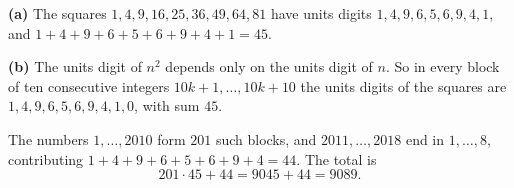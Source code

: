 \textbf{(a)} The squares $1,4,9,16,25,36,49,64,81$ have units digits $1,4,9,6,5,6,9,4,1$, and $1+4+9+6+5+6+9+4+1=45$.

\textbf{(b)} The units digit of $n^2$ depends only on the units digit of $n$. So in every block of ten consecutive integers $10k+1,\dots,10k+10$ the units digits of the squares are $1,4,9,6,5,6,9,4,1,0$, with sum $45$.

The numbers $1,\dots,2010$ form $201$ such blocks, and $2011,\dots,2018$ end in $1,\dots,8$, contributing $1+4+9+6+5+6+9+4=44$. The total is
\[
201\cdot45+44=9045+44=\boxed{9089}.
\]
